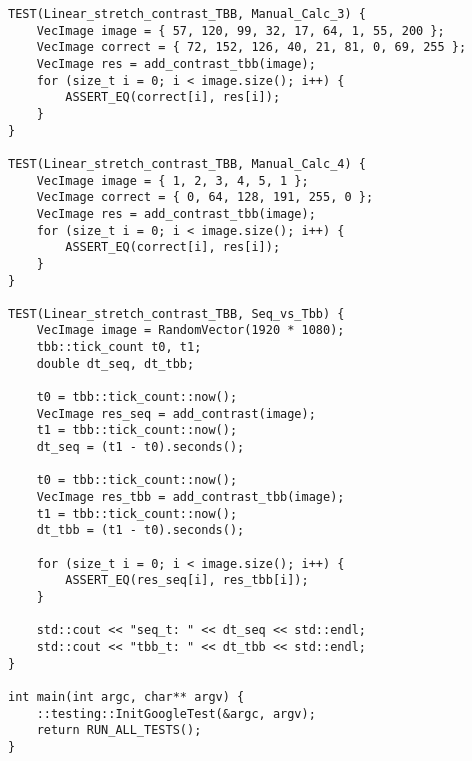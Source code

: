 \documentclass{report}
\begin{document}
\begin{lstlisting}
TEST(Linear_stretch_contrast_TBB, Manual_Calc_3) {
    VecImage image = { 57, 120, 99, 32, 17, 64, 1, 55, 200 };
    VecImage correct = { 72, 152, 126, 40, 21, 81, 0, 69, 255 };
    VecImage res = add_contrast_tbb(image);
    for (size_t i = 0; i < image.size(); i++) {
        ASSERT_EQ(correct[i], res[i]);
    }
}

TEST(Linear_stretch_contrast_TBB, Manual_Calc_4) {
    VecImage image = { 1, 2, 3, 4, 5, 1 };
    VecImage correct = { 0, 64, 128, 191, 255, 0 };
    VecImage res = add_contrast_tbb(image);
    for (size_t i = 0; i < image.size(); i++) {
        ASSERT_EQ(correct[i], res[i]);
    }
}

TEST(Linear_stretch_contrast_TBB, Seq_vs_Tbb) {
    VecImage image = RandomVector(1920 * 1080);
    tbb::tick_count t0, t1;
    double dt_seq, dt_tbb;

    t0 = tbb::tick_count::now();
    VecImage res_seq = add_contrast(image);
    t1 = tbb::tick_count::now();
    dt_seq = (t1 - t0).seconds();

    t0 = tbb::tick_count::now();
    VecImage res_tbb = add_contrast_tbb(image);
    t1 = tbb::tick_count::now();
    dt_tbb = (t1 - t0).seconds();

    for (size_t i = 0; i < image.size(); i++) {
        ASSERT_EQ(res_seq[i], res_tbb[i]);
    }

    std::cout << "seq_t: " << dt_seq << std::endl;
    std::cout << "tbb_t: " << dt_tbb << std::endl;
}

int main(int argc, char** argv) {
    ::testing::InitGoogleTest(&argc, argv);
    return RUN_ALL_TESTS();
}
    \end{lstlisting}
    
\end{document}
